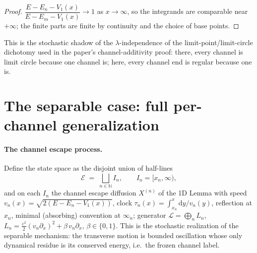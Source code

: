 \documentclass[11pt]{article}
\theoremstyle{remark}
\newcommand{\dd}{\mathrm{d}}
\newcommand{\N}{\mathbb{N}}
\newcommand{\calE}{\mathcal{E}}
\begin{document}
\begin{proof}
$\dfrac{E-E_{n}-V_{1}(x)}{E-E_{m}-V_{1}(x)}\to1$ as $x\to\infty$, so the
integrands are comparable near $+\infty$; the finite parts are finite by
continuity and the choice of base points.
\end{proof}

This is the stochastic shadow of the $\lambda$-independence of the
limit-point/limit-circle dichotomy used in the paper's channel-additivity
proof: there, every channel is limit circle because one channel is;
here, every channel end is regular because one is.

\section{The separable case: full per-channel generalization}
\label{sec:separable}

\paragraph{The channel escape process.}
Define the state space as the disjoint union of half-lines
\[
\calE\;=\;\bigsqcup_{n\in\N} I_{n},\qquad I_{n}=[x_{n},\infty),
\]
and on each $I_{n}$ the channel escape diffusion $X^{(n)}$ of the 1D
Lemma with speed
$v_{n}(x)=\sqrt{2(E-E_{n}-V_{1}(x))}$, clock
$\tau_{n}(x)=\int_{x_{n}}^{x}\dd y/v_{n}(y)$, reflection at $x_{n}$,
minimal (absorbing) convention at $\infty_{n}$; generator
$\mathcal L=\bigoplus_{n}L_{n}$,
$L_{n}=\tfrac{\varepsilon^{2}}{2}(v_{n}\partial_{x})^{2}
+\beta\,v_{n}\partial_{x}$, $\beta\in\{0,1\}$.  This is the stochastic
realization of the separable mechanism: the transverse motion is
bounded oscillation whose only dynamical residue is its conserved
energy, i.e.\ the frozen channel label.
\end{document}
